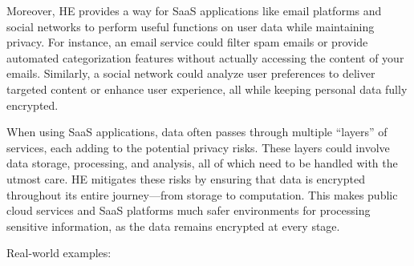 \documentclass[
  letterpaper,
  DIV=11,
  numbers=noendperiod,
  oneside]{scrartcl}
\begin{document}
Moreover, HE provides a way for SaaS applications like email platforms
and social networks to perform useful functions on user data while
maintaining privacy. For instance, an email service could filter spam
emails or provide automated categorization features without actually
accessing the content of your emails. Similarly, a social network could
analyze user preferences to deliver targeted content or enhance user
experience, all while keeping personal data fully encrypted.

When using SaaS applications, data often passes through multiple
``layers'' of services, each adding to the potential privacy risks.
These layers could involve data storage, processing, and analysis, all
of which need to be handled with the utmost care. HE mitigates these
risks by ensuring that data is encrypted throughout its entire
journey---from storage to computation. This makes public cloud services
and SaaS platforms much safer environments for processing sensitive
information, as the data remains encrypted at every stage.

Real-world examples:
\end{document}
